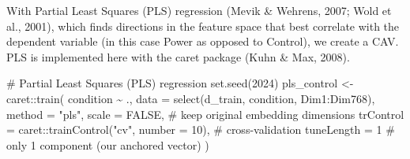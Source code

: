 \documentclass[
  man,
  floatsintext,
  longtable,
  nolmodern,
  notxfonts,
  notimes,
  colorlinks=true,linkcolor=blue,citecolor=blue,urlcolor=blue]{apa7}
\newenvironment{Shaded}{\begin{snugshade}}{\end{snugshade}}
\newcommand{\AttributeTok}[1]{\textcolor[rgb]{0.40,0.45,0.13}{#1}}
\newcommand{\CommentTok}[1]{\textcolor[rgb]{0.37,0.37,0.37}{#1}}
\newcommand{\ConstantTok}[1]{\textcolor[rgb]{0.56,0.35,0.01}{#1}}
\newcommand{\DecValTok}[1]{\textcolor[rgb]{0.68,0.00,0.00}{#1}}
\newcommand{\FunctionTok}[1]{\textcolor[rgb]{0.28,0.35,0.67}{#1}}
\newcommand{\NormalTok}[1]{\textcolor[rgb]{0.00,0.23,0.31}{#1}}
\newcommand{\OtherTok}[1]{\textcolor[rgb]{0.00,0.23,0.31}{#1}}
\newcommand{\SpecialCharTok}[1]{\textcolor[rgb]{0.37,0.37,0.37}{#1}}
\newcommand{\StringTok}[1]{\textcolor[rgb]{0.13,0.47,0.30}{#1}}
\begin{document}
\begin{Shaded}
\end{Shaded}

With Partial Least Squares (PLS) regression (Mevik \& Wehrens, 2007;
Wold et al., 2001), which finds directions in the feature space that
best correlate with the dependent variable (in this case Power as
opposed to Control), we create a CAV. PLS is implemented here with the
caret package (Kuhn \& Max, 2008).

\begin{Shaded}
\begin{Highlighting}[]
\CommentTok{\# Partial Least Squares (PLS) regression}
\FunctionTok{set.seed}\NormalTok{(}\DecValTok{2024}\NormalTok{)}
\NormalTok{pls\_control }\OtherTok{\textless{}{-}}\NormalTok{ caret}\SpecialCharTok{::}\FunctionTok{train}\NormalTok{(}
\NormalTok{  condition }\SpecialCharTok{\textasciitilde{}}\NormalTok{ ., }
  \AttributeTok{data =} \FunctionTok{select}\NormalTok{(d\_train, condition, Dim1}\SpecialCharTok{:}\NormalTok{Dim768), }
  \AttributeTok{method =} \StringTok{"pls"}\NormalTok{,}
  \AttributeTok{scale =} \ConstantTok{FALSE}\NormalTok{,  }\CommentTok{\# keep original embedding dimensions}
  \AttributeTok{trControl =}\NormalTok{ caret}\SpecialCharTok{::}\FunctionTok{trainControl}\NormalTok{(}\StringTok{"cv"}\NormalTok{, }\AttributeTok{number =} \DecValTok{10}\NormalTok{),  }\CommentTok{\# cross{-}validation}
  \AttributeTok{tuneLength =} \DecValTok{1}  \CommentTok{\# only 1 component (our anchored vector)}
\NormalTok{)}
\end{Highlighting}
\end{Shaded}
\end{document}
